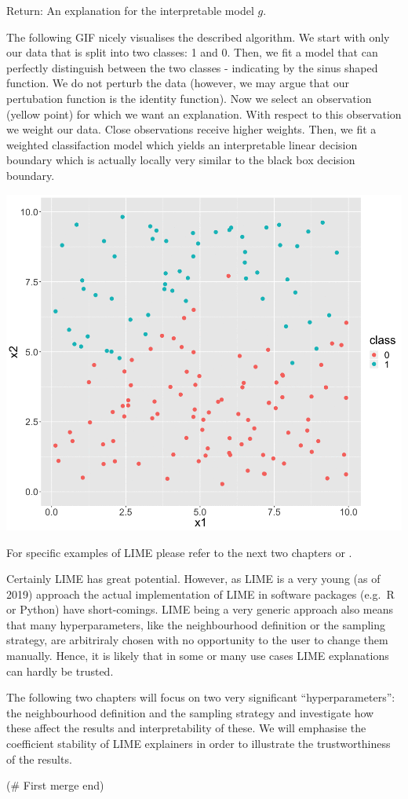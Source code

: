 \documentclass[]{krantz}
\begin{document}
Return: An explanation for the interpretable model \(g\).

The following GIF nicely visualises the described algorithm. We start
with only our data that is split into two classes: 1 and 0. Then, we fit
a model that can perfectly distinguish between the two classes -
indicating by the sinus shaped function. We do not perturb the data
(however, we may argue that our pertubation function is the identity
function). Now we select an observation (yellow point) for which we want
an explanation. With respect to this observation we weight our data.
Close observations receive higher weights. Then, we fit a weighted
classifaction model which yields an interpretable linear decision
boundary which is actually locally very similar to the black box
decision boundary.

\includegraphics{images/LIME.gif}

For specific examples of LIME please refer to the next two chapters or
\cite{Molnar}.

Certainly LIME has great potential. However, as LIME is a very young (as
of 2019) approach the actual implementation of LIME in software packages
(e.g.~R or Python) have short-comings. LIME being a very generic
approach also means that many hyperparameters, like the neighbourhood
definition or the sampling strategy, are arbitriraly chosen with no
opportunity to the user to change them manually. Hence, it is likely
that in some or many use cases LIME explanations can hardly be trusted.

The following two chapters will focus on two very significant
``hyperparameters'': the neighbourhood definition and the sampling
strategy and investigate how these affect the results and
interpretability of these. We will emphasise the coefficient stability
of LIME explainers in order to illustrate the trustworthiness of the
results.

(\# First merge end)
\end{document}

